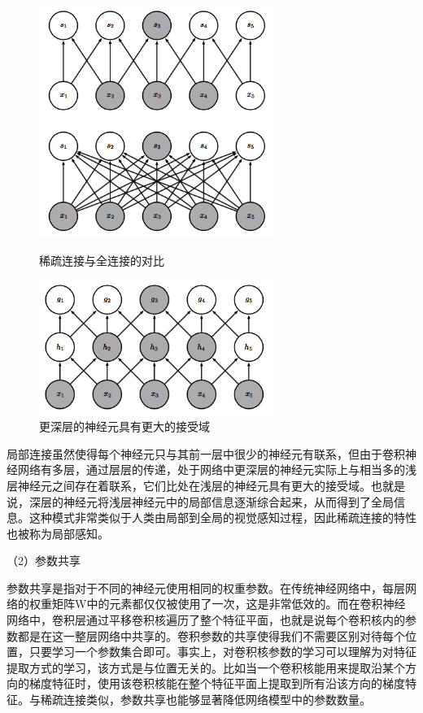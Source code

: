 \begin{figure}[htb] %
	\centering
	\begin{minipage}[c]{0.48\textwidth}
		\centering
		\includegraphics[width=3in]{figures/3_1_稀疏连接与全连接的对比}
		\caption{稀疏连接与全连接的对比}
	\end{minipage}
	\hfill
	\begin{minipage}[c]{0.48\textwidth}
		\centering
		\includegraphics[width=3in]{figures/3_1_更深层的神经元具有更大的接受域}
		\caption{更深层的神经元具有更大的接受域}
	\end{minipage}
\end{figure}

局部连接虽然使得每个神经元只与其前一层中很少的神经元有联系，但由于卷积神经网络有多层，通过层层的传递，处于网络中更深层的神经元实际上与相当多的浅层神经元之间存在着联系，它们比处在浅层的神经元具有更大的接受域。也就是说，深层的神经元将浅层神经元中的局部信息逐渐综合起来，从而得到了全局信息。这种模式非常类似于人类由局部到全局的视觉感知过程，因此稀疏连接的特性也被称为局部感知。

（2）参数共享

参数共享是指对于不同的神经元使用相同的权重参数。在传统神经网络中，每层网络的权重矩阵W中的元素都仅仅被使用了一次，这是非常低效的。而在卷积神经网络中，卷积层通过平移卷积核遍历了整个特征平面，也就是说每个卷积核内的参数都是在这一整层网络中共享的。卷积参数的共享使得我们不需要区别对待每个位置，只要学习一个参数集合即可。事实上，对卷积核参数的学习可以理解为对特征提取方式的学习，该方式是与位置无关的。比如当一个卷积核能用来提取沿某个方向的梯度特征时，使用该卷积核能在整个特征平面上提取到所有沿该方向的梯度特征。与稀疏连接类似，参数共享也能够显著降低网络模型中的参数数量。

